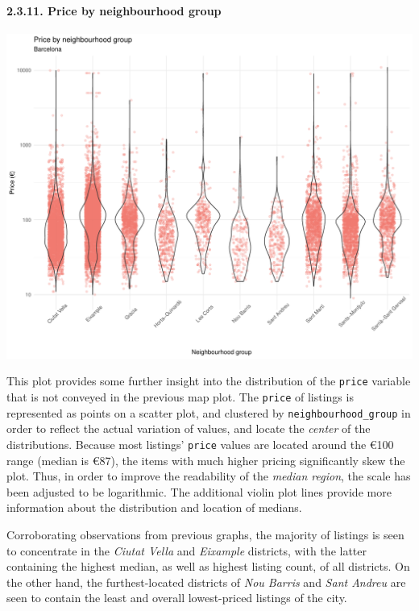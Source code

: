 \documentclass[
]{article}
\begin{document}
\hypertarget{price-by-neighbourhood-group}{%
\paragraph{2.3.11. Price by neighbourhood
group}\label{price-by-neighbourhood-group}}

\begin{center}\includegraphics{Barcelona-AirBnB-Insights_files/figure-latex/plot11-1} \end{center}

This plot provides some further insight into the distribution of the
\texttt{price} variable that is not conveyed in the previous map plot.
The \texttt{price} of listings is represented as points on a scatter
plot, and clustered by \texttt{neighbourhood\_group} in order to reflect
the actual variation of values, and locate the \emph{center} of the
distributions. Because most listings' \texttt{price} values are located
around the €100 range (median is €87), the items with much higher
pricing significantly skew the plot. Thus, in order to improve the
readability of the \emph{median region}, the scale has been adjusted to
be logarithmic. The additional violin plot lines provide more
information about the distribution and location of medians.

Corroborating observations from previous graphs, the majority of
listings is seen to concentrate in the \emph{Ciutat Vella} and
\emph{Eixample} districts, with the latter containing the highest
median, as well as highest listing count, of all districts. On the other
hand, the furthest-located districts of \emph{Nou Barris} and \emph{Sant
Andreu} are seen to contain the least and overall lowest-priced listings
of the city.
\end{document}
